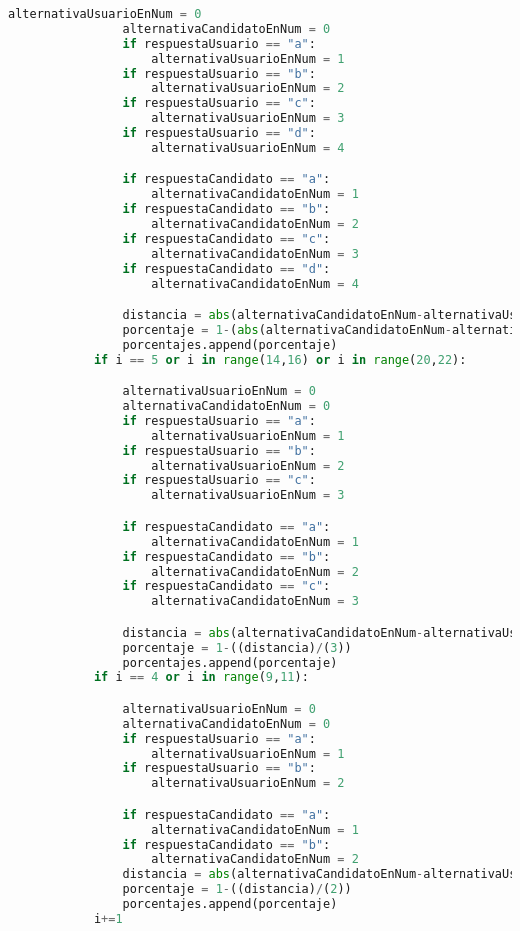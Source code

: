 \documentclass[a4paper]{article}
\begin{document}
\begin{lstlisting}[language = Python]
                alternativaUsuarioEnNum = 0
                alternativaCandidatoEnNum = 0
                if respuestaUsuario == "a":
                    alternativaUsuarioEnNum = 1
                if respuestaUsuario == "b":
                    alternativaUsuarioEnNum = 2
                if respuestaUsuario == "c":
                    alternativaUsuarioEnNum = 3
                if respuestaUsuario == "d":
                    alternativaUsuarioEnNum = 4

                if respuestaCandidato == "a":
                    alternativaCandidatoEnNum = 1
                if respuestaCandidato == "b":
                    alternativaCandidatoEnNum = 2
                if respuestaCandidato == "c":
                    alternativaCandidatoEnNum = 3
                if respuestaCandidato == "d":
                    alternativaCandidatoEnNum = 4

                distancia = abs(alternativaCandidatoEnNum-alternativaUsuarioEnNum)
                porcentaje = 1-(abs(alternativaCandidatoEnNum-alternativaUsuarioEnNum))/(4)
                porcentajes.append(porcentaje)
            if i == 5 or i in range(14,16) or i in range(20,22):

                alternativaUsuarioEnNum = 0
                alternativaCandidatoEnNum = 0
                if respuestaUsuario == "a":
                    alternativaUsuarioEnNum = 1
                if respuestaUsuario == "b":
                    alternativaUsuarioEnNum = 2
                if respuestaUsuario == "c":
                    alternativaUsuarioEnNum = 3

                if respuestaCandidato == "a":
                    alternativaCandidatoEnNum = 1
                if respuestaCandidato == "b":
                    alternativaCandidatoEnNum = 2
                if respuestaCandidato == "c":
                    alternativaCandidatoEnNum = 3

                distancia = abs(alternativaCandidatoEnNum-alternativaUsuarioEnNum)
                porcentaje = 1-((distancia)/(3))
                porcentajes.append(porcentaje)
            if i == 4 or i in range(9,11):

                alternativaUsuarioEnNum = 0
                alternativaCandidatoEnNum = 0
                if respuestaUsuario == "a":
                    alternativaUsuarioEnNum = 1
                if respuestaUsuario == "b":
                    alternativaUsuarioEnNum = 2

                if respuestaCandidato == "a":
                    alternativaCandidatoEnNum = 1
                if respuestaCandidato == "b":
                    alternativaCandidatoEnNum = 2
                distancia = abs(alternativaCandidatoEnNum-alternativaUsuarioEnNum)
                porcentaje = 1-((distancia)/(2))
                porcentajes.append(porcentaje)   
            i+=1



\end{lstlisting}
\end{document}
